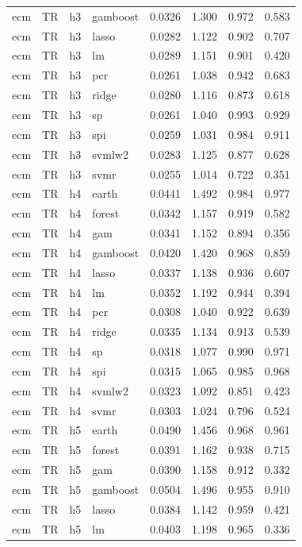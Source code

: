 \begin{ThreePartTable}
\begin{longtable}[t]{llclcccc}
ecm & TR & h3 & gamboost & 0.0326 & 1.300 & 0.972 & 0.583\\
ecm & TR & h3 & lasso & 0.0282 & 1.122 & 0.902 & 0.707\\
ecm & TR & h3 & lm & 0.0289 & 1.151 & 0.901 & 0.420\\
ecm & TR & h3 & pcr & 0.0261 & 1.038 & 0.942 & 0.683\\
ecm & TR & h3 & ridge & 0.0280 & 1.116 & 0.873 & 0.618\\
ecm & TR & h3 & sp & 0.0261 & 1.040 & 0.993 & 0.929\\
ecm & TR & h3 & spi & 0.0259 & 1.031 & 0.984 & 0.911\\
ecm & TR & h3 & svmlw2 & 0.0283 & 1.125 & 0.877 & 0.628\\
ecm & TR & h3 & svmr & 0.0255 & 1.014 & 0.722 & 0.351\\
\addlinespace
ecm & TR & h4 & earth & 0.0441 & 1.492 & 0.984 & 0.977\\
ecm & TR & h4 & forest & 0.0342 & 1.157 & 0.919 & 0.582\\
ecm & TR & h4 & gam & 0.0341 & 1.152 & 0.894 & 0.356\\
ecm & TR & h4 & gamboost & 0.0420 & 1.420 & 0.968 & 0.859\\
ecm & TR & h4 & lasso & 0.0337 & 1.138 & 0.936 & 0.607\\
ecm & TR & h4 & lm & 0.0352 & 1.192 & 0.944 & 0.394\\
ecm & TR & h4 & pcr & 0.0308 & 1.040 & 0.922 & 0.639\\
ecm & TR & h4 & ridge & 0.0335 & 1.134 & 0.913 & 0.539\\
ecm & TR & h4 & sp & 0.0318 & 1.077 & 0.990 & 0.971\\
ecm & TR & h4 & spi & 0.0315 & 1.065 & 0.985 & 0.968\\
ecm & TR & h4 & svmlw2 & 0.0323 & 1.092 & 0.851 & 0.423\\
ecm & TR & h4 & svmr & 0.0303 & 1.024 & 0.796 & 0.524\\
\addlinespace
ecm & TR & h5 & earth & 0.0490 & 1.456 & 0.968 & 0.961\\
ecm & TR & h5 & forest & 0.0391 & 1.162 & 0.938 & 0.715\\
ecm & TR & h5 & gam & 0.0390 & 1.158 & 0.912 & 0.332\\
ecm & TR & h5 & gamboost & 0.0504 & 1.496 & 0.955 & 0.910\\
ecm & TR & h5 & lasso & 0.0384 & 1.142 & 0.959 & 0.421\\
ecm & TR & h5 & lm & 0.0403 & 1.198 & 0.965 & 0.336\\

\end{longtable}
\end{ThreePartTable}
